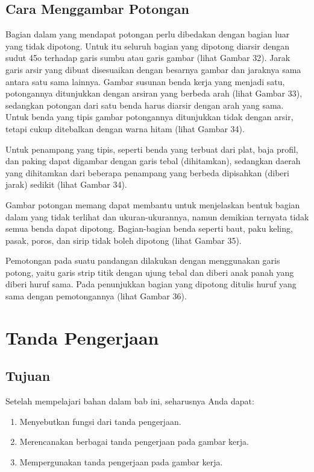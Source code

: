\documentclass[11pt]{simart} %
\begin{document}
\subsection{Cara Menggambar Potongan}
Bagian dalam yang mendapat potongan perlu dibedakan dengan bagian luar yang tidak dipotong. Untuk itu seluruh bagian yang dipotong diarsir dengan sudut 45o terhadap garis sumbu atau garis gambar (lihat Gambar 32). Jarak garis arsir yang dibuat disesuaikan dengan besarnya gambar dan jaraknya sama antara satu sama lainnya. Gambar susunan benda kerja yang menjadi satu, potongannya ditunjukkan dengan arsiran yang berbeda arah (lihat Gambar 33), sedangkan potongan dari satu benda harus diarsir dengan arah yang sama. Untuk benda yang tipis gambar potongannya ditunjukkan tidak dengan arsir, tetapi cukup ditebalkan dengan warna hitam (lihat Gambar 34).

Untuk penampang yang tipis, seperti benda yang terbuat dari plat, baja profil, dan paking dapat digambar dengan garis tebal (dihitamkan), sedangkan daerah yang dihitamkan dari beberapa penampang yang berbeda dipisahkan (diberi jarak) sedikit (lihat Gambar 34).

Gambar potongan memang dapat membantu untuk menjelaskan bentuk bagian dalam yang tidak terlihat dan ukuran-ukurannya, namun demikian ternyata tidak semua benda dapat dipotong. Bagian-bagian benda seperti baut, paku keling, pasak, poros, dan sirip tidak boleh dipotong (lihat Gambar 35).

Pemotongan pada suatu pandangan dilakukan dengan menggunakan garis potong, yaitu garis strip titik dengan ujung tebal dan diberi anak panah yang diberi huruf sama. Pada penunjukkan bagian yang dipotong ditulis huruf yang sama dengan pemotongannya (lihat Gambar 36).

\section{Tanda Pengerjaan}

\subsection*{Tujuan}
Setelah mempelajari bahan dalam bab ini, seharusnya Anda dapat:
\begin{enumerate}
	\item Menyebutkan fungsi dari tanda pengerjaan.
	\item Merencanakan berbagai tanda pengerjaan pada gambar kerja.
	\item Mempergunakan tanda pengerjaan pada gambar kerja.
\end{enumerate}
\end{document}
